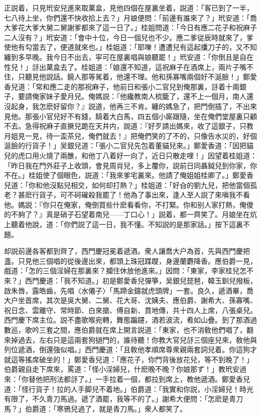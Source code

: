 正説着，只見玳安兒進來取菓盒，見他四個在屋裏坐着，説道：「客已到了一半，七八待上坐，你們還不快收拾上去？」月娘便問：「前邊有誰來了？」玳安道：「喬大爹花大爹大舅二舅謝爹都來了這一日了。」桂姐問道：「今日有應二花子和祝麻子二人沒有？」玳安道：「會中十位，今日一個兒也不少。應二爹従辰時就來了，爹使他有勾當去了，便道就來也。」桂姐道：「耶嚛！遭遭兒有這起攮刀子的，又不知纏到多早晚。我今日不出去，寜可在屋裏唱與娘聽罷！」玳安道：「你倒且是自在性兒！」㧱出菓盒去了。桂姐道：「娘還不知道，這祝麻子在酒席上，兩片子嘴不住，只聽見他説話。饒人那等駡着，他還不理。他和孫寡嘴兩個好不涎臉！」鄭愛香兒道：「常和應二走的那祝麻子，他前日和張小二官兒到俺那裏，㧱着十兩銀子，要請俺家妹子愛月兒。俺媽説：『他纔教南人梳籠了，還不上一個月，南人還沒起身，我怎麽好留你？』説道，他再三不肯。纏的媽急了，把門倒插了，不出來見他。那張小官兒好不有錢，騎着大白馬，四五個小廝跟隨，坐在俺們堂屋裏只顧不去。急得祝麻子直撅兒跪在天井内，說道：『好歹請出媽來，收了這銀子，只教月姐見一見，待一盃茶兒，俺們就去！』把俺們笑的了不的，只像告水災的，好個涎臉的行貨子！」吴銀兒道：「張小二官兒先包着董貓兒來。」鄭愛香道：「因把貓兒的虎口用火燒了兩醮，和他丁八着好一向了，近日只散走哩！」因望着桂姐道：「昨日我在門外莊子上收頭，會見周肖兒，多上覆你，説前日同聶鉞兒到你家，你不在。」桂姐使了個眼色，説道：「我來爹宅裏來。他請了俺姐姐桂卿了。」鄭愛香兒道：「你和他沒點兒相交，如何却打熱？」桂姐道：「好㒲的劉九兒，把他當個孤老？甚麽行貨子，可不砢磪殺我罷了！他為了事出來，逢人至人説了來嗔我不看他。媽説：『你只在俺家，俺倒買些什麽看看你，不打緊。你和别人家打熱，俺儍的不夠了？』真是硝子石望着南兒——丁口心！」説着，都一齊笑了。月娘坐在炕上聽着他說，道：「你們説了這一日，我不懂。不知説的是那家話。」按下這裏不題。

却説前邊各客都到齊了，西門慶冠冕着遞酒。衆人讓喬大户為首，先與西門慶把盞。只見他三個唱的從後邊出來，都頭上珠冠蹀躞，身邊蘭麝降香。應伯爵一見，戲道：「怎的三個淫婦在那裏來？攔住休放他進來。」因問：「東家，李家桂兒怎不來？」西門慶道：「我不知道。」初是鄭愛香兒彈箏，吴銀兒琵琶，韓玉釧兒撥板，啟朱唇，露皓齒，先唱〈水僊子〉「馬蹄金鑄就虎頭牌」一套。良久，遞酒畢，喬大户坐首席，其次是吳大舅、二舅、花大哥、沈姨夫、應伯爵、謝希大、孫寡嘴、祝日念、雲離守、常時節、白來搶、傅自新、賁地傳，共十四人上席，八張桌兒。西門慶下席主位。説不盡歌喉宛轉，舞態蹁躚，酒若波流，肴如山疊。到了那酒過數巡，歌吟三套之間，應伯爵就在席上開言説道：「東家，也不消敎他們唱了，翻來掉過去，左右只是這兩套狗撾門的，誰待聽！你教大官兒㧱三個座兒來，敎他與列位遞酒，倒還強似唱。」西門慶道：「且敎他孝順席尊衆親兩套詞兒着。你這狗才就這等搖席破坐的！」鄭愛香兒道：「應花子，你門背後放花兒，等不到晚了！」伯爵親自走下席來，罵道：「怪小淫婦兒，什麽晚不晚？你娘那ず！」教玳安過來：「你替他把刑法都㧱了。」一手拉着一個，都拉到席上，教他遞酒。鄭愛香兒道：「怪行貨子！拉的人手脚兒不着地。」伯爵道：「我實和你説，小淫婦兒！時光有限了，不久青刀馬過。遞了酒罷，我等不的了。」謝希大便問：「怎麽是青刀馬？」伯爵道：「寒鴉兒過了，就是青刀馬。」衆人都笑了。

